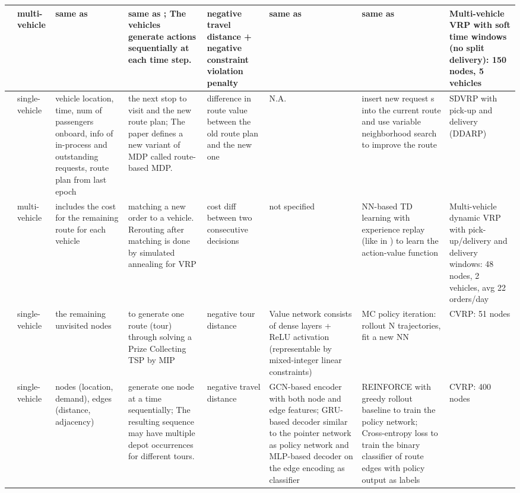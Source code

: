 \documentclass{article}
\begin{document}
\begin{table}
\begin{tabular}{||p{}|p{}|p{}|p{}|p{}|p{}|p{}|p{}||}
\cite{zhang2020multi} & multi-vehicle & same as \citep{kool2018attention} & same as \citep{kool2018attention}; The vehicles generate actions sequentially at each time step. & negative travel distance + negative constraint violation penalty & same as \citep{kool2018attention} & same as \citep{kool2018attention} & Multi-vehicle VRP with soft time windows (no split delivery): 150 nodes, 5 vehicles \\
\hline
\cite{ulmer2020modeling} & single-vehicle & vehicle location, time, num of passengers onboard, info of in-process and outstanding requests, route plan from last epoch & the next stop to visit and the new route plan; The paper defines a new variant of MDP called route-based MDP. & difference in route value between the old route plan and the new one & N.A. & insert new request s into the current route and use variable neighborhood search to improve the route & SDVRP with pick-up and delivery (DDARP) \\
\hline
\cite{joe2020deep} & multi-vehicle & includes the cost for the remaining route for each vehicle & matching a new order to a vehicle. Rerouting after matching is done by simulated annealing for VRP & cost diff between two consecutive decisions & not specified & NN-based TD learning with experience replay (like in \citep{tang2019deep}) to learn the action-value function & Multi-vehicle dynamic VRP with pick-up/delivery and delivery windows: 48 nodes, 2 vehicles, avg 22 orders/day \\
\hline
\cite{delarue2020reinforcement} & single-vehicle & the remaining unvisited nodes & to generate one route (tour) through solving a Prize Collecting TSP by MIP & negative tour distance & Value network consists of dense layers + ReLU activation (representable by mixed-integer linear constraints) & MC policy iteration: rollout N trajectories, fit a new NN & CVRP: 51 nodes \\
\hline
\cite{duan2020efficiently} & single-vehicle & nodes (location, demand), edges (distance, adjacency) & generate one node at a time sequentially; The resulting sequence may have multiple depot occurrences for different tours. & negative travel distance & GCN-based encoder with both node and edge features; GRU-based decoder similar to the pointer network as policy network and MLP-based decoder on the edge encoding as classifier & REINFORCE with greedy rollout baseline \citep{kool2018attention} to train the policy network; Cross-entropy loss to train the binary classifier of route edges with policy output as labels & CVRP: 400 nodes \\

\end{tabular}
\end{table}
\end{document}
